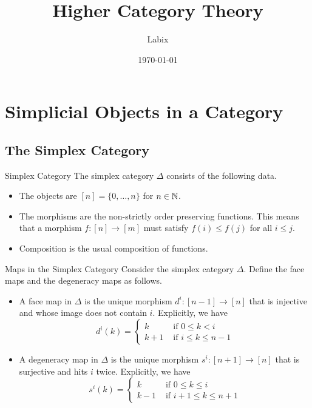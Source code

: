 \documentclass[a4paper]{article}
\title{Higher Category Theory}
\author{Labix}
\date{\today}
\begin{document}
\maketitle
\begin{abstract}
\begin{itemize}
\end{itemize}
\end{abstract}
\pagebreak
\tableofcontents

\pagebreak

\section{Simplicial Objects in a Category}
\subsection{The Simplex Category}
\begin{defn}{Simplex Category}{} The simplex category $\Delta$ consists of the following data. 
\begin{itemize}
\item The objects are $[n]=\{0,\dots,n\}$ for $n\in\mathbb{N}$. 
\item The morphisms are the non-strictly order preserving functions. This means that a morphism $f:[n]\to[m]$ must satisfy $f(i)\leq f(j)$ for all $i\leq j$. 
\item Composition is the usual composition of functions. 
\end{itemize}
\end{defn}

\begin{defn}{Maps in the Simplex Category}{} Consider the simplex category $\Delta$. Define the face maps and the degeneracy maps as follows. 
\begin{itemize}
\item A face map in $\Delta$ is the unique morphism $d^i:[n-1]\to[n]$ that is injective and whose image does not contain $i$. Explicitly, we have $$d^i(k)=\begin{cases}
k & \text{ if } 0\leq k <i\\
k+1 & \text{ if } i\leq k\leq n-1
\end{cases}$$
\item A degeneracy map in $\Delta$ is the unique morphism $s^i:[n+1]\to[n]$ that is surjective and hits $i$ twice. Explicitly, we have $$s^i(k)=\begin{cases}
k & \text{ if } 0\leq k\leq i\\
k-1 & \text{ if } i+1\leq k\leq n+1
\end{cases}$$
\end{itemize}
\end{defn}
\end{document}
